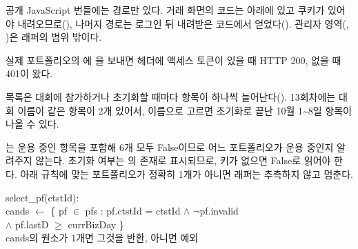 \seclabel
{}

 공개 JavaScript 번들에는  경로만 있다. 거래 화면의 코드는  아래에 있고  쿠키가 있어야 내려오므로(), 나머지 경로는 로그인 뒤 내려받은 코드에서 얻었다(). 관리자 영역(, )은 래퍼의 범위 밖이다.



 실제 포트폴리오의 에 을 보내면 헤더에 액세스 토큰이 있을 때 HTTP 200, 없을 때 401이 왔다.

  목록은 대회에 참가하거나 초기화할 때마다 항목이 하나씩 늘어난다(). 13회차에는 대회 이름이 같은 항목이 2개 있어서, 이름으로 고르면 초기화로 끝난 10월 1\textasciitilde 8일 항목이 나올 수 있다.



 는 운용 중인 항목을 포함해 6개 모두 False이므로 어느 포트폴리오가 운용 중인지 알려주지 않는다. 초기화 여부는 의 존재로 표시되므로, 키가 없으면 False로 읽어야 한다. 아래 규칙에 맞는 포트폴리오가 정확히 1개가 아니면 래퍼는 추측하지 않고 멈춘다.

\par\noindent\begin{minipage}{\linewidth}\fontsize{8.5}{11}\selectfont\ttfamily
\hspace*{4mm}select\_pf(ctstId):\\
\hspace*{8mm}cands $\leftarrow$ \{ pf $\in$ pfs : pf.ctstId = ctstId $\wedge$ $\neg$pf.invalid\\
\hspace*{38mm}$\wedge$ pf.lastD $\geq$ currBizDay \}\\
\hspace*{8mm}cands의 원소가 1개면 그것을 반환, 아니면 예외\end{minipage}\par\vspace{4pt}

